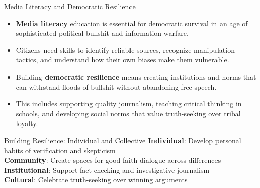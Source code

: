 \documentclass{beamer}
\begin{document}
	\begin{frame}{Media Literacy and Democratic Resilience}
		\begin{itemize}
			\item \textbf{Media literacy} education is essential for democratic survival in an age of sophisticated political bullshit and information warfare.
			\item Citizens need skills to identify reliable sources, recognize manipulation tactics, and understand how their own biases make them vulnerable.
			\item Building \textbf{democratic resilience} means creating institutions and norms that can withstand floods of bullshit without abandoning free speech.
			\item This includes supporting quality journalism, teaching critical thinking in schools, and developing social norms that value truth-seeking over tribal loyalty.
		\end{itemize}
		
		\begin{block}{Building Resilience: Individual and Collective}
			\textbf{Individual}: Develop personal habits of verification and skepticism\\
			\textbf{Community}: Create spaces for good-faith dialogue across differences\\
			\textbf{Institutional}: Support fact-checking and investigative journalism\\
			\textbf{Cultural}: Celebrate truth-seeking over winning arguments
		\end{block}
	\end{frame}
	
\end{document}
